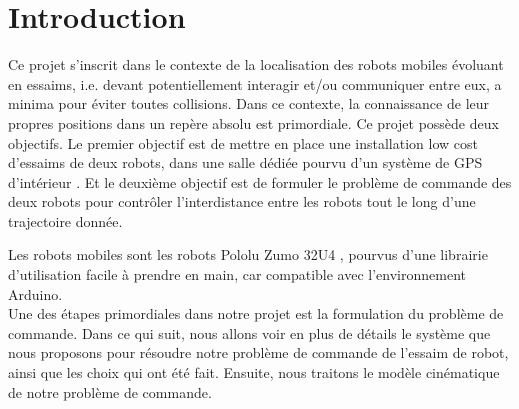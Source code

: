 \section{Introduction}

Ce projet s’inscrit dans le contexte de la localisation des robots mobiles évoluant en essaims, i.e. devant potentiellement interagir et/ou communiquer entre eux, a minima pour éviter toutes collisions. Dans ce contexte, la connaissance de leur propres positions dans un repère absolu est primordiale. Ce projet possède deux objectifs. Le premier objectif est de mettre en place une installation \og low cost \fg{} d’essaims de deux robots, dans une salle dédiée pourvu d’un système de \og GPS d’intérieur \fg{}. Et le deuxième objectif est de formuler le problème de commande des deux robots pour contrôler l'interdistance entre les robots tout le long d'une trajectoire donnée.

\noindent Les robots mobiles sont les robots Pololu Zumo 32U4 \cite{pololu-url},  pourvus d’une librairie d’utilisation facile à prendre en main, car compatible avec l’environnement Arduino. \\[1pt]


Une des étapes primordiales dans notre projet est la formulation du problème de commande. Dans ce qui suit, nous allons voir en plus de détails le système que nous proposons pour résoudre notre problème de commande de l'essaim de robot, ainsi que les choix qui ont été fait. Ensuite, nous traitons le modèle cinématique de notre problème de commande. 